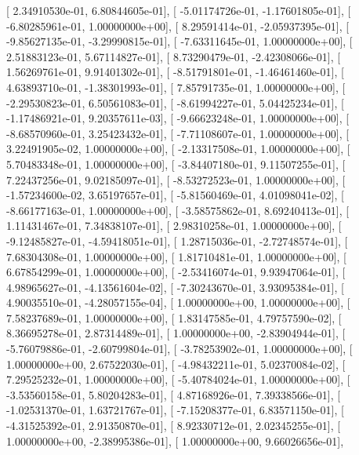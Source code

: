 \documentclass{article}
\begin{document}
       [  2.34910530e-01,   6.80844605e-01],
       [ -5.01174726e-01,  -1.17601805e-01],
       [ -6.80285961e-01,   1.00000000e+00],
       [  8.29591414e-01,  -2.05937395e-01],
       [ -9.85627135e-01,  -3.29990815e-01],
       [ -7.63311645e-01,   1.00000000e+00],
       [  2.51883123e-01,   5.67114827e-01],
       [  8.73290479e-01,  -2.42308066e-01],
       [  1.56269761e-01,   9.91401302e-01],
       [ -8.51791801e-01,  -1.46461460e-01],
       [  4.63893710e-01,  -1.38301993e-01],
       [  7.85791735e-01,   1.00000000e+00],
       [ -2.29530823e-01,   6.50561083e-01],
       [ -8.61994227e-01,   5.04425234e-01],
       [ -1.17486921e-01,   9.20357611e-03],
       [ -9.66623248e-01,   1.00000000e+00],
       [ -8.68570960e-01,   3.25423432e-01],
       [ -7.71108607e-01,   1.00000000e+00],
       [  3.22491905e-02,   1.00000000e+00],
       [ -2.13317508e-01,   1.00000000e+00],
       [  5.70483348e-01,   1.00000000e+00],
       [ -3.84407180e-01,   9.11507255e-01],
       [  7.22437256e-01,   9.02185097e-01],
       [ -8.53272523e-01,   1.00000000e+00],
       [ -1.57234600e-02,   3.65197657e-01],
       [ -5.81560469e-01,   4.01098041e-02],
       [ -8.66177163e-01,   1.00000000e+00],
       [ -3.58575862e-01,   8.69240413e-01],
       [  1.11431467e-01,   7.34838107e-01],
       [  2.98310258e-01,   1.00000000e+00],
       [ -9.12485827e-01,  -4.59418051e-01],
       [  1.28715036e-01,  -2.72748574e-01],
       [  7.68304308e-01,   1.00000000e+00],
       [  1.81710481e-01,   1.00000000e+00],
       [  6.67854299e-01,   1.00000000e+00],
       [ -2.53416074e-01,   9.93947064e-01],
       [  4.98965627e-01,  -4.13561604e-02],
       [ -7.30243670e-01,   3.93095384e-01],
       [  4.90035510e-01,  -4.28057155e-04],
       [  1.00000000e+00,   1.00000000e+00],
       [  7.58237689e-01,   1.00000000e+00],
       [  1.83147585e-01,   4.79757590e-02],
       [  8.36695278e-01,   2.87314489e-01],
       [  1.00000000e+00,  -2.83904944e-01],
       [ -5.76079886e-01,  -2.60799804e-01],
       [ -3.78253902e-01,   1.00000000e+00],
       [  1.00000000e+00,   2.67522030e-01],
       [ -4.98432211e-01,   5.02370084e-02],
       [  7.29525232e-01,   1.00000000e+00],
       [ -5.40784024e-01,   1.00000000e+00],
       [ -3.53560158e-01,   5.80204283e-01],
       [  4.87168926e-01,   7.39338566e-01],
       [ -1.02531370e-01,   1.63721767e-01],
       [ -7.15208377e-01,   6.83571150e-01],
       [ -4.31525392e-01,   2.91350870e-01],
       [  8.92330712e-01,   2.02345255e-01],
       [  1.00000000e+00,  -2.38995386e-01],
       [  1.00000000e+00,   9.66026656e-01],
\end{document}
